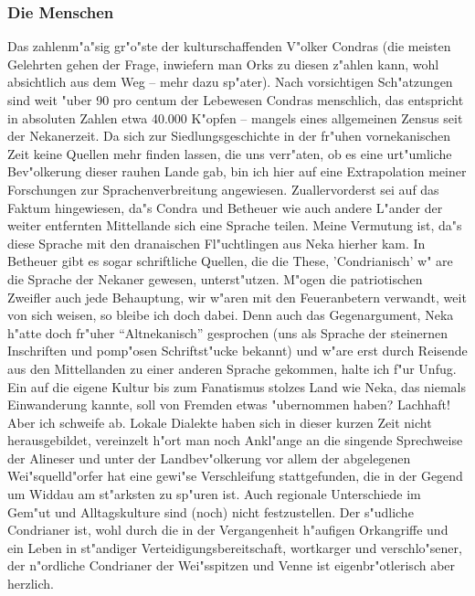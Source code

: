 \documentclass[a5paper,8pt]{book}
\begin{document}
\newpage

\subsubsection{Die Menschen}

Das zahlenm"a"sig gr"o"ste der kulturschaffenden V"olker Condras (die meisten Gelehrten gehen der Frage, inwiefern man Orks zu diesen z"ahlen kann, wohl absichtlich aus dem Weg – mehr dazu sp"ater). Nach vorsichtigen Sch"atzungen sind weit "uber 90 pro centum der Lebewesen Condras menschlich, das entspricht in absoluten Zahlen etwa 40.000 K"opfen – mangels eines allgemeinen Zensus seit der Nekanerzeit. Da sich zur Siedlungsgeschichte in der fr"uhen vornekanischen Zeit keine Quellen mehr finden lassen, die uns verr"aten, ob es eine urt"umliche Bev"olkerung dieser rauhen Lande gab, bin ich hier auf eine Extrapolation meiner Forschungen zur Sprachenverbreitung angewiesen. Zuallervorderst sei auf das Faktum hingewiesen, da"s Condra und Betheuer wie auch andere L"ander der weiter entfernten Mittellande sich eine Sprache teilen. Meine Vermutung ist, da"s diese Sprache mit den dranaischen Fl"uchtlingen aus Neka hierher kam. In Betheuer gibt es sogar schriftliche Quellen, die die These, 'Condrianisch' w"
are die Sprache der Nekaner gewesen, unterst"utzen. M"ogen die patriotischen Zweifler auch jede Behauptung, wir w"aren mit den Feueranbetern verwandt, weit von sich weisen, so bleibe ich doch dabei. Denn auch das Gegenargument, Neka h"atte doch fr"uher “Altnekanisch” gesprochen (uns als Sprache der steinernen Inschriften und pomp"osen Schriftst"ucke bekannt) und w"are erst durch Reisende aus den Mittellanden zu einer anderen Sprache gekommen, halte ich f"ur Unfug. Ein auf die eigene Kultur bis zum Fanatismus stolzes Land wie Neka, das niemals Einwanderung kannte, soll von Fremden etwas "ubernommen haben? Lachhaft! Aber ich schweife ab.
Lokale Dialekte haben sich in dieser kurzen Zeit nicht herausgebildet, vereinzelt h"ort man noch Ankl"ange an die singende Sprechweise der Alineser und unter der Landbev"olkerung vor allem der abgelegenen Wei"squelld"orfer hat eine gewi"se Verschleifung stattgefunden, die in der Gegend um Widdau am st"arksten zu sp"uren ist. Auch regionale Unterschiede im Gem"ut und Alltagskulture sind (noch) nicht festzustellen. Der s"udliche Condrianer ist, wohl durch die in der Vergangenheit h"aufigen Orkangriffe und ein Leben in st"andiger Verteidigungsbereitschaft, wortkarger und verschlo"sener, der n"ordliche Condrianer der Wei"sspitzen und Venne ist eigenbr"otlerisch aber herzlich.
\end{document}
